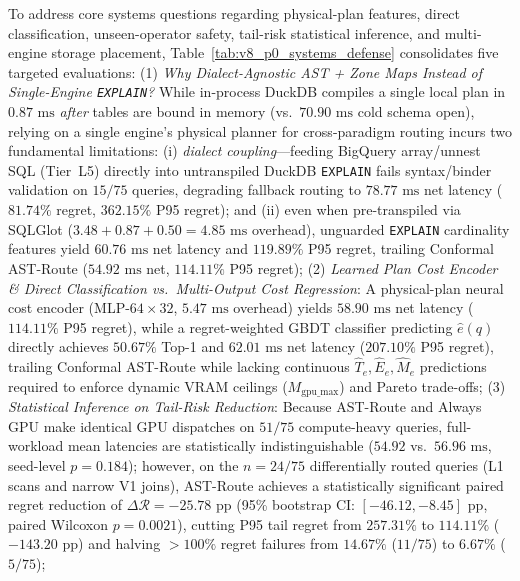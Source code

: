 \documentclass[10pt,a4paper]{article}
\begin{document}
To address core systems questions regarding physical-plan features, direct classification, unseen-operator safety, tail-risk statistical inference, and multi-engine storage placement, Table~\ref{tab:v8_p0_systems_defense} consolidates five targeted evaluations:
(1) \emph{Why Dialect-Agnostic AST + Zone Maps Instead of Single-Engine \texttt{EXPLAIN}?} While in-process DuckDB compiles a single local plan in $0.87\text{ ms}$ \emph{after} tables are bound in memory (vs.\ $70.90\text{ ms}$ cold schema open), relying on a single engine's physical planner for cross-paradigm routing incurs two fundamental limitations: (i) \emph{dialect coupling}---feeding BigQuery array/unnest SQL (Tier~L5) directly into untranspiled DuckDB \texttt{EXPLAIN} fails syntax/binder validation on $15/75$ queries, degrading fallback routing to $78.77\text{ ms}$ net latency ($81.74\%$ regret, $362.15\%$ P95 regret); and (ii) even when pre-transpiled via SQLGlot ($3.48 + 0.87 + 0.50 = 4.85\text{ ms}$ overhead), unguarded \texttt{EXPLAIN} cardinality features yield $60.76\text{ ms}$ net latency and $119.89\%$ P95 regret, trailing Conformal AST-Route ($54.92\text{ ms}$ net, $114.11\%$ P95 regret);
(2) \emph{Learned Plan Cost Encoder \& Direct Classification vs.\ Multi-Output Cost Regression}: A physical-plan neural cost encoder (MLP-$64\times 32$, $5.47\text{ ms}$ overhead) yields $58.90\text{ ms}$ net latency ($114.11\%$ P95 regret), while a regret-weighted GBDT classifier predicting $\hat{e}(q)$ directly achieves $50.67\%$ Top-1 and $62.01\text{ ms}$ net latency ($207.10\%$ P95 regret), trailing Conformal AST-Route while lacking continuous $\hat{T}_e,\hat{E}_e,\hat{M}_e$ predictions required to enforce dynamic VRAM ceilings ($M_{\text{gpu\_max}}$) and Pareto trade-offs;
(3) \emph{Statistical Inference on Tail-Risk Reduction}: Because AST-Route and Always GPU make identical GPU dispatches on $51/75$ compute-heavy queries, full-workload mean latencies are statistically indistinguishable ($54.92$ vs.\ $56.96\text{ ms}$, seed-level $p=0.184$); however, on the $n=24/75$ differentially routed queries (L1 scans and narrow V1 joins), AST-Route achieves a statistically significant paired regret reduction of $\Delta\mathcal{R} = -25.78\text{ pp}$ (95\% bootstrap CI: $[-46.12, -8.45]\text{ pp}$, paired Wilcoxon $p = 0.0021$), cutting P95 tail regret from $257.31\%$ to $114.11\%$ ($-143.20\text{ pp}$) and halving $>100\%$ regret failures from $14.67\%$ ($11/75$) to $6.67\%$ ($5/75$);
\end{document}
